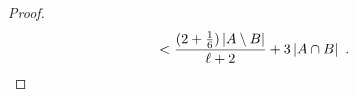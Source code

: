 \documentclass{patmorin}
\newcommand{\pat}[1]{\textcolor{Blue}{[Pat: #1]}}
\begin{document}
\begin{proof}
\begin{align*}
    & < \frac{(2+\tfrac{1}{6})\,|A\setminus B|}{\ell+2} + 3\,|A\cap B| \enspace . \qedhere
  \end{align*}
\end{proof}




  
\end{document}
